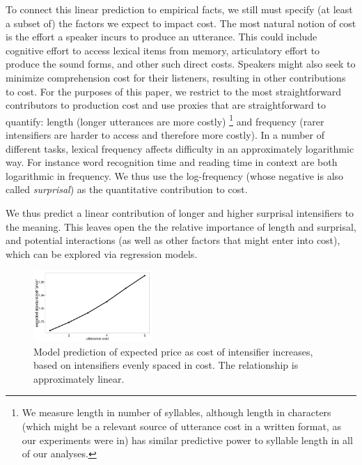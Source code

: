 \documentclass[10pt,letterpaper]{article}
\begin{document}
To connect this linear prediction to empirical facts, we still must specify (at least a subset of) the factors we expect to impact cost.
The most natural notion of cost is the effort a speaker incurs to produce an utterance. This could include cognitive effort to access lexical items from memory, articulatory effort to produce 
the sound forms, and other such direct costs.
Speakers might also seek to minimize comprehension cost for their listeners, resulting in other contributions to cost. 
For the purposes of this paper, we restrict to the most
straightforward contributors to production cost and use proxies that are straightforward to quantify: length (longer utterances are more costly)
\footnote{We measure length in number of syllables, although length in characters (which might be a relevant source of utterance cost in a written format, as our experiments were in) has similar predictive power to syllable length in all of our analyses.}
and frequency (rarer intensifiers are harder to access and therefore more costly).
In a number of different tasks, lexical frequency affects difficulty in an approximately logarithmic way. For instance word recognition time \cite{McCusker1977} 
and reading time in context \cite{smithLevy} are both logarithmic in frequency. We thus use the log-frequency (whose negative is also called \emph{surprisal}) as the quantitative contribution to cost.

We thus predict  a linear contribution of longer and higher surprisal intensifiers to the meaning. 
This leaves open the the relative importance of length and surprisal, and potential interactions (as well as other factors that might enter into cost), which can be explored via regression models.

\begin{figure}[ht]
\begin{center}\includegraphics[width=0.4\textwidth]{height-by-cost.png}
\end{center}
\caption{Model prediction of expected price as cost of intensifier increases, based on intensifiers evenly spaced in cost. The relationship is approximately linear.} 
\label{model-heights}
\end{figure}
\end{document}
